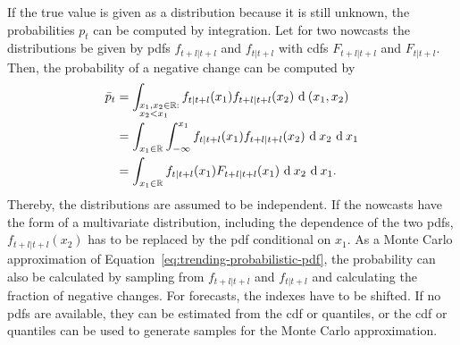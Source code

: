 If the true value is given as a distribution because it is still unknown, the probabilities $p_t$ can be computed by integration.
Let for two nowcasts the distributions be given by \acp{pdf} $f_{t+l|t+l}$ and $f_{t|t+l}$ with \acp{cdf}  $F_{t+l|t+l}$ and $F_{t|t+l}$.
Then, the probability of a negative change can be computed by
\begin{align}
    \bar{p}_t
        &= \int_{\begin{subarray}{l}x_1, x_2 \in \R: \\ x_2 < x_1\end{subarray}} f_{t|t+l} (x_1) f_{t+l|t+l} (x_2)  \ \textrm{d} \: (x_1, x_2) \nonumber\\
        &= \int_{x_1 \in \R} \int_{-\infty}^{x_1} f_{t|t+l} (x_1) f_{t+l|t+l} (x_2)  \ \textrm{d} \: x_2 \ \textrm{d} \: x_1 \nonumber\\
        &= \int_{x_1 \in \R} f_{t|t+l} (x_1) F_{t+l|t+l} (x_1)  \ \textrm{d} \: x_2 \ \textrm{d} \: x_1 \label{eq:trending-probabilistic-pdf}.
\end{align}
Thereby, the distributions are assumed to be independent.
If the nowcasts have the form of a multivariate distribution, including the dependence of the two \acp{pdf}, $f_{t+l|t+l} (x_2)$ has to be replaced by the \ac{pdf} conditional on $x_1$.
As a Monte Carlo approximation of Equation~\eqref{eq:trending-probabilistic-pdf}, the probability can also be calculated by sampling from $f_{t+l|t+l}$ and $f_{t|t+l}$ and calculating the fraction of negative changes.
For forecasts, the indexes have to be shifted.
If no \acp{pdf} are available, they can be estimated from the \ac{cdf} or quantiles, or the \ac{cdf} or quantiles can be used to generate samples for the Monte Carlo approximation.
